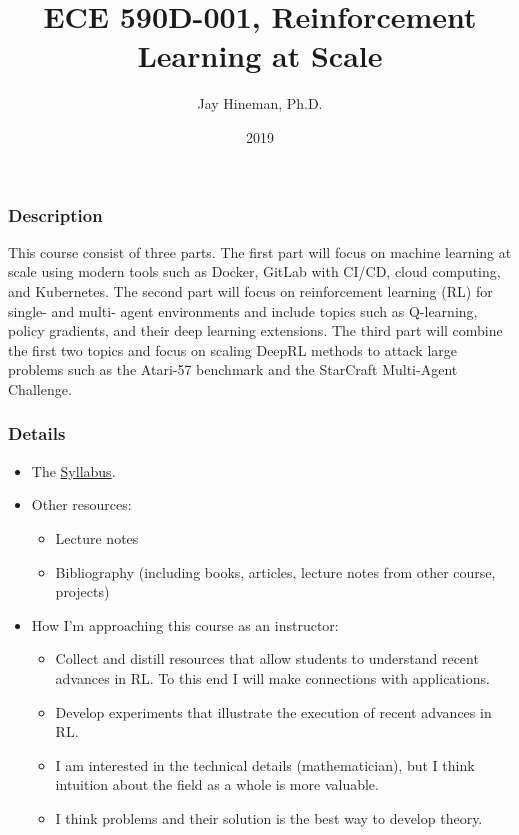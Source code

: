 \documentclass{beamer}
\title{ECE 590D-001, Reinforcement Learning at Scale}
\author{Jay Hineman, Ph.D.}
\institute{Geometric Data Analytics}
\date{2019}
\begin{document}
 
\frame{\titlepage}
 
\begin{frame}
  \frametitle{Description}
  This course consist of three parts. The first part will focus on machine
learning at scale using modern tools such as Docker, GitLab with CI/CD, cloud
computing, and Kubernetes. The second part will focus on reinforcement learning
(RL) for single- and multi- agent environments and include topics such as
Q-learning, policy gradients, and their deep learning extensions. The third part
will combine the first two topics and focus on scaling DeepRL methods to attack
large problems such as the Atari-57 benchmark and the StarCraft Multi-Agent
Challenge.
\end{frame}

\begin{frame}
  \frametitle{Details}
  \begin{itemize}
  \item The \href{https://github.com/jhineman/spring2019ece590hineman}{Syllabus}.
  \item Other resources:
    \begin{itemize}
    \item Lecture notes
    \item Bibliography (including books, articles, lecture notes from other course, projects)
    \end{itemize}
  \item How I'm approaching this course as an instructor:
    \begin{itemize}
    \item Collect and distill resources that allow students to understand recent advances in RL.
      To this end I will make connections with applications.
    \item Develop experiments that illustrate the execution of recent advances in RL.
    \item I am interested in the technical details (mathematician), but I think intuition about
      the field as a whole is more valuable.
    \item I think problems and their solution is the best way to develop theory.
    \end{itemize}
  \end{itemize}
\end{frame}
\end{document}
